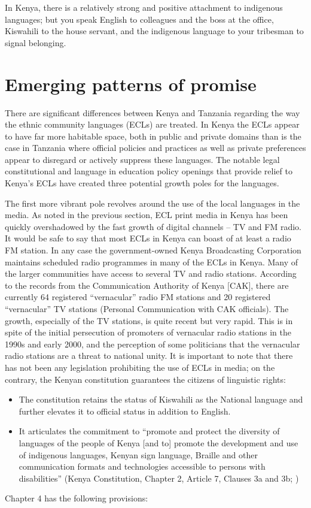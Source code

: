 \documentclass[output=paper,colorlinks,citecolor=brown]{langscibook}
\begin{document}
In Kenya, there is a relatively strong and positive attachment to indigenous languages; but you speak English to colleagues and the boss at the office, Kiswahili to the house servant, and the indigenous language to your tribesman to signal belonging.

\section{Emerging patterns of promise}\label{sec:kioko:3}

There are significant differences between Kenya and Tanzania regarding the way the ethnic community languages (ECLs) are treated. In Kenya the ECLs appear to have far more habitable space, both in public and private domains than is the case in Tanzania where official policies and practices as well as private preferences appear to disregard or actively suppress these languages. The notable legal constitutional and language in education policy openings that provide relief to Kenya’s ECLs have created three potential growth poles for the languages. 

The first more vibrant pole revolves around the use of the local languages in the media. As noted in the previous section, ECL print media in Kenya has been quickly overshadowed by the fast growth of digital channels – TV and FM radio. It would be safe to say that most ECLs in Kenya can boast of at least a radio FM station. In any case the government-owned Kenya Broadcasting Corporation maintains scheduled radio programmes in many of the ECLs in Kenya. Many of the larger communities have access to several TV and radio stations. According to the records from the Communication Authority of Kenya [CAK], there are currently 64 registered “vernacular” radio FM stations and 20 registered “vernacular” TV stations (Personal Communication with CAK officials).  The growth, especially of the TV stations, is quite recent but very rapid.  This is in spite of the initial persecution of promoters of vernacular radio stations in the 1990s and early 2000, and the perception of some politicians that the vernacular radio stations are a threat to national unity.  It is important to note that there has not been any legislation prohibiting the use of ECLs in media; on the contrary, the Kenyan constitution guarantees the citizens of linguistic rights:

\begin{itemize}
    \item The constitution retains the status of Kiswahili as the National language and further elevates it to official status in addition to English.  
    \item It articulates the commitment to “promote and protect the diversity of languages of the people of Kenya [and to] promote the development and use of indigenous languages, Kenyan sign language, Braille and other communication formats and technologies accessible to persons with disabilities” (Kenya Constitution, Chapter 2, Article 7, Clauses 3a and 3b; \citealt{Republic-of-Kenya2010})

\end{itemize}
Chapter 4 has the following provisions:
\end{document}
